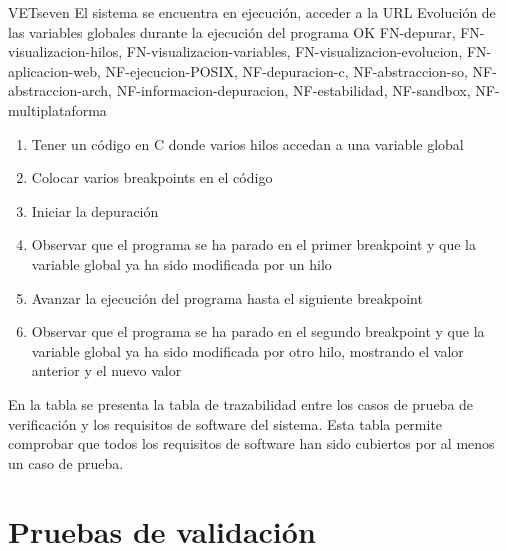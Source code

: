     \begin{testCase}{VET}{seven}
        {El sistema se encuentra en ejecución, acceder a la URL}
        {\NA}
        {Evolución de las variables globales durante la ejecución del programa}
        {OK}
        {FN-depurar, FN-visualizacion-hilos, FN-visualizacion-variables, FN-visualizacion-evolucion, FN-aplicacion-web, NF-ejecucion-POSIX, NF-depuracion-c, NF-abstraccion-so, NF-abstraccion-arch, NF-informacion-depuracion, NF-estabilidad, NF-sandbox, NF-multiplataforma}
        \begin{enumerate}
            \item Tener un código en C donde varios hilos accedan a una variable global
            \item Colocar varios breakpoints en el código
            \item Iniciar la depuración
            \item Observar que el programa se ha parado en el primer breakpoint y que la variable global ya ha sido modificada por un hilo
            \item Avanzar la ejecución del programa hasta el siguiente breakpoint
            \item Observar que el programa se ha parado en el segundo breakpoint y que la variable global ya ha sido modificada por otro hilo, mostrando el valor anterior y el nuevo valor
        \end{enumerate}
    \end{testCase}

En la tabla  se presenta la tabla de trazabilidad entre los casos de prueba de verificación y los requisitos de software del sistema. Esta tabla permite comprobar que todos los requisitos de software han sido cubiertos por al menos un caso de prueba.
\FloatBarrier
    
\begin{landscape}
\begin{table}[htb]
      {\traceabilityVETSR}
  \end{table}
\end{landscape}

\section{Pruebas de validación}\label{sec:validacion}

